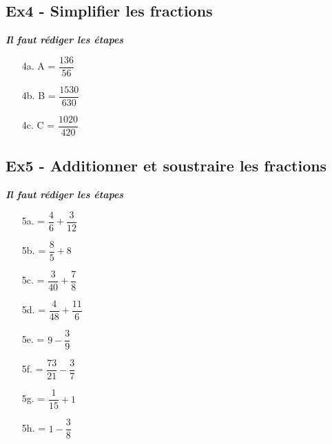 \documentclass[12pt]{article}
\begin{document}
\subsection*{Ex4 - Simplifier les fractions}

\textit{\textbf{Il faut rédiger les étapes}}

\begin{multicols}{3}
  \begin{enumerate}
    \item[4a.] A = $\dfrac{136}{56}$
    \item[4b.] B = $\dfrac{1530}{630}$
    \item[4c.] C = $\dfrac{1020}{420}$
  \end{enumerate} 
\end{multicols}


\subsection*{Ex5 - Additionner et soustraire les fractions}

\textit{\textbf{Il faut rédiger les étapes}}

\begin{multicols}{4}
  \begin{enumerate}
    \item[5a.]  = $\dfrac{4}{6} + \dfrac{3}{12}$
    \item[5b.]  = $\dfrac{8}{5} + 8$
    \item[5c.]  = $\dfrac{3}{40} + \dfrac{7}{8}$
    \item[5d.]  = $\dfrac{4}{48} + \dfrac{11}{6}$
    \item[5e.]  = $9 - \dfrac{3}{9}$
    \item[5f.]  = $\dfrac{73}{21} - \dfrac{3}{7}$
    \item[5g.]  = $\dfrac{1}{15} + 1$
    \item[5h.]  = $1 - \dfrac{3}{8}$
    \end{enumerate} 
\end{multicols}
\end{document}
